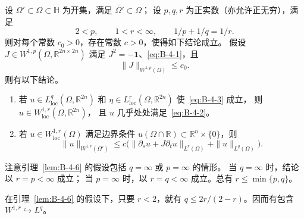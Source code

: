 \begin{lemma}\label{lem:B-4-6}
设 $\Omega'\subset\Omega\subset\mathbb H$ 为开集，满足
$\overline{\Omega'}\subset\Omega$；
设 $p,q,r$ 为正实数（亦允许正无穷），满足
\[
  2<p,\qquad 1<r<\infty,\qquad 1/p+1/q=1/r.
\]
则对每个常数 $c_0>0$，存在常数 $c>0$，使得如下结论成立。
假设 $J\in W^{1,p}(\Omega,\mathbb R^{2n\times2n})$ 满足
$J^2=-\mathbf 1$、\eqref{eq:B-4-1}，且
\[
  \|J\|_{W^{1,p}(\Omega)}\le c_0.
\]
则有以下结论。
\begin{enumerate}[label=\textup{(\roman*)}]
\item 若 $u\in L^q_{\mathrm{loc}}(\Omega,\mathbb R^{2n})$ 和
$\eta\in L^r_{\mathrm{loc}}(\Omega,\mathbb R^{2n})$ 使~\eqref{eq:B-4-3} 成立，
则 $u\in W^{1,r}_{\mathrm{loc}}(\Omega,\mathbb R^{2n})$，
且 $u$ 几乎处处满足~\eqref{eq:B-4-2}。
\item 若 $u\in W^{1,r}_{\mathrm{loc}}(\Omega)$ 满足边界条件
$u(\Omega\cap\mathbb R)\subset\mathbb R^n\times\{0\}$，则
\[
  \|u\|_{W^{1,r}(\Omega')}\le
  c\bigl(\|\partial_su+J\partial_tu\|_{L^r(\Omega)}
  +\|u\|_{L^q(\Omega)}\bigr).
\]
\end{enumerate}
\end{lemma}

\begin{remark}\label{rem:B-4-7}
注意引理~\ref{lem:B-4-6} 的假设包括 $q=\infty$ 或 $p=\infty$ 的情形。
当 $q=\infty$ 时，结论以 $r=p<\infty$ 成立；
当 $p=\infty$ 时，以 $r=q<\infty$ 成立。总有 $r\le\min\{p,q\}$。
\end{remark}

\begin{remark}\label{rem:B-4-8}
在引理~\ref{lem:B-4-6} 的假设下，只要 $r<2$，就有
$q\le2r/(2-r)$。因而有包含 $W^{1,r}\hookrightarrow L^q$。
\end{remark}

